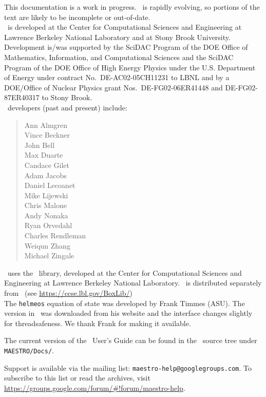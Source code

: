 This documentation is a work in progress.  \maestro\ is rapidly
evolving, so portions of the text are likely to be incomplete or
out-of-date. \\

\noindent \maestro\ is developed at the Center for Computational Sciences and
Engineering at Lawrence Berkeley National Laboratory and at Stony
Brook University.  Development is/was supported by the SciDAC Program of
the DOE Office of Mathematics, Information, and Computational Sciences
and the SciDAC Program of the DOE Office of High Energy Physics under
the U.S. Department of Energy under contract No.\ DE-AC02-05CH11231 to
LBNL and by a DOE/Office of Nuclear Physics grant Nos.\
DE-FG02-06ER41448 and DE-FG02-87ER40317 to Stony Brook.  \\

\noindent \maestro\ developers (past and present) include: 
\begin{quote}
Ann Almgren \\
Vince Beckner \\
John Bell \\
Max Duarte \\
Candace Gilet \\
Adam Jacobs \\
Daniel Lecoanet \\
Mike Lijewski \\
Chris Malone \\
Andy Nonaka \\
Ryan Orvedahl \\
Charles Rendleman \\
Weiqun Zhang \\
Michael Zingale
\end{quote}

\noindent \maestro\ uses the \boxlib\ library,
developed at the Center for Computational Sciences and Engineering at
Lawrence Berkeley National Laboratory.  \boxlib\ is distributed
separately from \maestro\ (see
\url{https://ccse.lbl.gov/BoxLib/})
\\

\noindent The {\tt helmeos} equation of state was developed by Frank Timmes (ASU).
The version in \maestro\ was downloaded from his website and the
interface changes slightly for threadsafeness.  We thank Frank for
making it available.

\noindent The current version of the \maestro\ User's Guide can be found in 
the \maestro\ source tree under {\tt MAESTRO/Docs/}.


\noindent Support is available via the mailing list: {\tt maestro-help@googlegroups.com}.  To subscribe to this list or read the archives, visit
\url{https://groups.google.com/forum/#!forum/maestro-help}.
